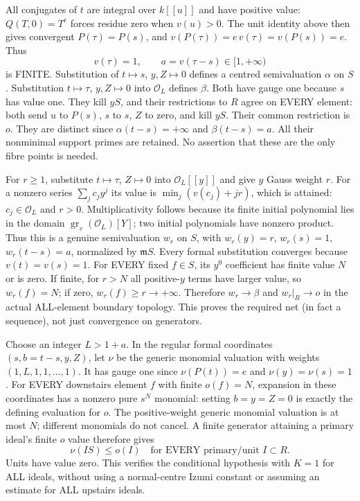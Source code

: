 \documentclass[11pt]{article}
\begin{document}
All conjugates of $t$ are integral over $k[[u]]$ and have positive value:
$Q(T,0)=T^e$ forces residue zero when $v(u)>0$. The unit identity above
then gives convergent $P(\tau)=P(s)$, and
$v(P(\tau))=e\,v(\tau)=v(P(s))=e$. Thus
\[
 v(\tau)=1,\qquad a=v(\tau-s)\in[1,+\infty)
\]
is FINITE. Substitution of $t\mapsto s$, $y,Z\mapsto0$ defines a
centred semivaluation $\alpha$ on $S$. Substitution
$t\mapsto\tau$, $y,Z\mapsto0$ into $\mathcal O_L$ defines $\beta$.
Both have gauge one because $s$ has value one. They kill $yS$, and their
restrictions to $R$ agree on EVERY element: both send $u$ to $P(s)$,
$s$ to $s$, $Z$ to zero, and kill $yS$. Their common restriction is $o$.
They are distinct since $\alpha(t-s)=+\infty$ and $\beta(t-s)=a$.
All their nonminimal support primes are retained. No assertion that these
are the only fibre points is needed.

For $r\ge1$, substitute $t\mapsto\tau$, $Z\mapsto0$ into
$\mathcal O_L[[y]]$ and give $y$ Gauss weight $r$. For a nonzero series
$\sum_j c_jy^j$ its value is $\min_j(v(c_j)+jr)$, which is attained:
$c_j\in\mathcal O_L$ and $r>0$. Multiplicativity follows because its
finite initial polynomial lies in the domain
$\operatorname{gr}_v(\mathcal O_L)[Y]$; two initial polynomials have
nonzero product. Thus this is a genuine semivaluation $w_r$ on $S$,
with $w_r(y)=r$, $w_r(s)=1$, $w_r(t-s)=a$, normalized by $\mathfrak mS$.
Every formal substitution converges because $v(t)=v(s)=1$.
For EVERY fixed $f\in S$, its $y^0$ coefficient has finite value $N$ or
is zero. If finite, for $r>N$ all positive-$y$ terms have larger value,
so $w_r(f)=N$; if zero, $w_r(f)\ge r\to+\infty$.
Therefore $w_r\to\beta$ and $w_r|_R\to o$ in the actual ALL-element
boundary topology. This proves the required net (in fact a sequence),
not just convergence on generators.

Choose an integer $L>1+a$. In the regular formal coordinates
$(s,b=t-s,y,Z)$, let $\nu$ be the generic monomial valuation with
weights $(1,L,1,1,\ldots,1)$. It has gauge one since $\nu(P(t))=e$
and $\nu(y)=\nu(s)=1$. For EVERY downstairs element $f$ with finite
$o(f)=N$, expansion in these coordinates has a nonzero pure $s^N$
monomial: setting $b=y=Z=0$ is exactly the defining evaluation for $o$.
The positive-weight generic monomial valuation is at most $N$; different
monomials do not cancel. A finite generator attaining a primary ideal's
finite $o$ value therefore gives
\[
 \nu(IS)\le o(I)\quad\text{for EVERY primary/unit }I\subset R.
\]
Units have value zero. This verifies the conditional hypothesis with
$K=1$ for ALL ideals, without using a normal-centre Izumi constant or
assuming an estimate for ALL upstairs ideals.
\end{document}
